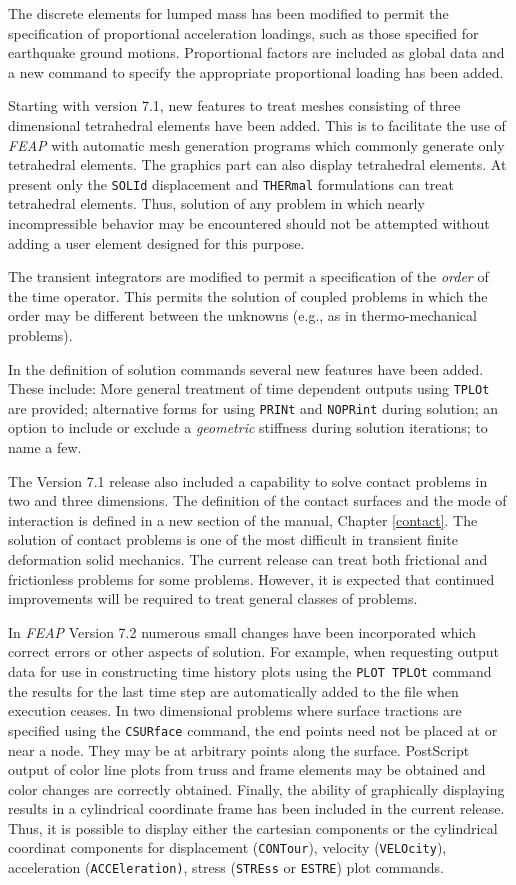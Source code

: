 The discrete elements for lumped mass has been modified
to permit the specification of proportional acceleration loadings, such
as those specified for earthquake ground motions.  Proportional factors
are included as global data and a new command to specify the appropriate
proportional loading has been added.

Starting with version 7.1, new features to treat meshes consisting of
three dimensional tetrahedral elements
have been added.  This is to facilitate the use of {\sl FEAP} with automatic
mesh generation programs which commonly generate only tetrahedral elements.
The graphics part can also display tetrahedral elements.  At present only
the {\tt SOLId} displacement and {\tt THERmal} formulations
can treat tetrahedral elements.
Thus, solution of any problem in which nearly incompressible
behavior may be encountered should not be attempted without adding a user
element designed for this purpose.
 
The transient integrators are modified to permit a specification of the 
{\it order} of the time operator.  This permits the solution of coupled
problems in which the order may be different between the unknowns (e.g.,
as in thermo-mechanical problems).

In the definition of solution commands several new features have been
added.  These include:
More general treatment of time dependent outputs using {\tt TPLOt}
are provided; alternative forms for using {\tt PRINt} and {\tt NOPRint}
during solution; an option to include or exclude a {\it geometric}
stiffness during solution iterations; to name a few.

The Version 7.1 release also included a capability to solve contact problems
in two and three dimensions.  The definition of the contact surfaces
and the mode of interaction is defined in a new section of the manual,
Chapter \ref{contact}.  The solution of contact problems is one of the
most difficult in transient finite deformation solid mechanics.  The
current release can treat both frictional and frictionless problems for
some problems.  However, it is expected that continued improvements will
be required to treat general classes of problems.

In \textsl{FEAP} Version 7.2 numerous small changes have been incorporated
which correct errors or other aspects of solution.  For example, when
requesting output data for use in constructing time history plots using
the \texttt{PLOT TPLOt} command the results for the last time step are
automatically added to the file when execution ceases.  In two dimensional
problems where surface tractions are specified using the \texttt{CSURface}
command, the end points need not be placed at or near a node.  They may
be at arbitrary points along the surface.
PostScript output of color line plots from truss and frame elements
may be obtained and color changes are correctly obtained.
Finally, the ability of graphically displaying results in a cylindrical
coordinate frame has been included in the current release.  Thus, it is
possible to display either the cartesian components or the cylindrical
coordinat components for displacement (\texttt{CONTour}), velocity
(\texttt{VELOcity}), acceleration (\texttt{ACCEleration)}, stress
(\texttt{STREss} or \texttt{ESTRE}) plot commands.

